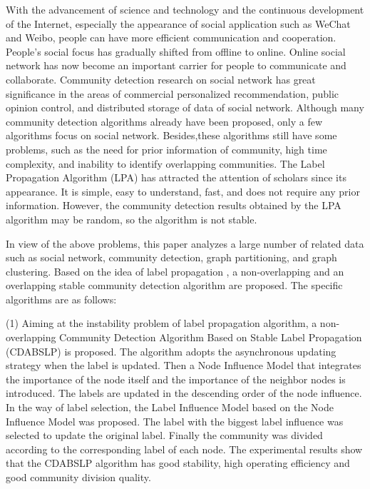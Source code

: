 \begin{englishabstract}

With the advancement of science and technology and the continuous development of the Internet, especially the appearance of social application such as WeChat and Weibo, people can have more efficient communication and cooperation. People's social focus has gradually shifted from offline to online. Online social network has now become an important carrier for people to communicate and collaborate. Community detection research on social network has great significance in the areas of commercial personalized recommendation, public opinion control, and distributed storage of data of social network. Although many community detection algorithms already have been proposed, only a few algorithms focus on social network. Besides,these algorithms still have some problems, such as the need for prior information of community, high time complexity, and inability to identify overlapping communities. The Label Propagation Algorithm (LPA) has attracted the attention of scholars since its appearance. It is simple, easy to understand, fast, and does not require any prior information. However, the community detection results obtained by the LPA algorithm may be random, so the algorithm is not stable.

In view of the above problems, this paper analyzes a large number of related data such as social network, community detection, graph partitioning, and graph clustering. Based on the idea of label propagation , a non-overlapping and  an overlapping stable community detection algorithm are proposed. The specific algorithms are as follows:

(1) Aiming at the instability problem of label propagation algorithm, a non-overlapping Community Detection Algorithm Based on Stable Label Propagation (CDABSLP) is proposed. The algorithm adopts the asynchronous updating strategy when the label is updated. Then a Node Influence Model that integrates the importance of the node itself and the importance of the neighbor nodes is introduced. The labels are updated in the descending order of the node influence. In the way of label selection, the Label Influence Model based on the Node Influence Model was proposed. The label with the biggest label influence was selected to update the original label. Finally the community was divided according to the corresponding label of each node. The experimental results show that the CDABSLP algorithm has good stability, high operating efficiency and good community division quality.
   

\end{englishabstract}
